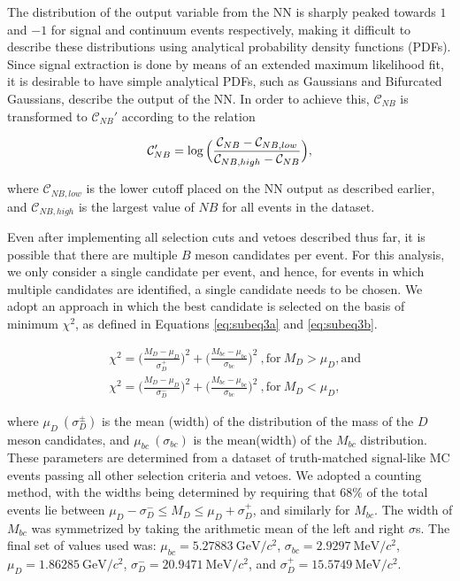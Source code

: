 \documentclass[aps,prl,twocolumn,superscriptaddress,showpacs,preprintnumbers,amsmath,amssymb]{revtex4}
\begin{document}
The distribution of the output variable from the NN is sharply peaked towards $1$ and $-1$ for signal and continuum events respectively, making it difficult to describe these distributions using analytical probability density functions (PDFs). Since signal extraction is done by means of an extended maximum likelihood fit, it is desirable to have simple analytical PDFs, such as Gaussians and Bifurcated Gaussians, describe the output of the NN. In order to achieve this, $\mathcal{C}_{NB}$ is transformed to $\mathcal{C}_{NB}'$ according to the relation

\begin{equation}
\label{eq:2
}
\mathcal{C}_{NB}' = \log \Big{(}\frac{\mathcal{C}_{NB} - \mathcal{C}_{NB,low}}{\mathcal{C}_{NB,high} - \mathcal{C}_{NB}}\Big{)},
\end{equation}

\noindent where $\mathcal{C}_{NB,low}$ is the lower cutoff placed on the NN output as described earlier, and $\mathcal{C}_{NB,high}$ is the largest value of $NB$ for all events in the dataset.

Even after implementing all selection cuts and vetoes described thus far, it is possible that there are multiple $B$ meson candidates per event. For this analysis, we only consider a single candidate per event, and hence, for events in which multiple candidates are identified, a single candidate needs to be chosen. We adopt an approach in which the best candidate is selected on the basis of minimum $\chi^2$, as defined in Equations \ref{eq:subeq3a} and \ref{eq:subeq3b}.

\begin{subequations} \label{eq:3}
\begin{align}
&\chi^2 = \big( \frac{M_D - \mu_D}{\sigma^+_D} \big)^2 +  \big( \frac{M_{bc} - \mu_{bc}}{\sigma_{bc}} \big)^2  ~, \text{for} ~ M_D > \mu_D, \text{and} \label{eq:subeq3a}\\
&\chi^2 = \big( \frac{M_D - \mu_D}{\sigma^-_D} \big)^2 + \big( \frac{M_{bc} - \mu_{bc}}{\sigma_{bc}} \big)^2  ~, \text{for} ~ M_D < \mu_D, \label{eq:subeq3b}
\end{align}
\end{subequations}

\noindent where $\mu_D ~ (\sigma^{\pm}_D)$ is the mean (width) of the distribution of the mass of the $D$ meson candidates, and $\mu_{bc} ~ (\sigma_{bc})$ is the mean(width) of the $M_{bc}$ distribution. These parameters are determined from a dataset of truth-matched signal-like MC events passing all other selection criteria and vetoes. We adopted a counting method, with the widths being determined by requiring that 68\% of the total events lie between $\mu_D - \sigma^-_D \leq M_D \leq \mu_D + \sigma^+_D$, and similarly for $M_{bc}$. The width of $M_{bc}$ was symmetrized by taking the arithmetic mean of the left and right $\sigma$s. The final set of values used was: $\mu_{bc} = 5.27883 ~\mathrm{GeV/}c^2$, $\sigma_{bc} = 2.9297 ~\mathrm{MeV/}c^2$, $\mu_{D} = 1.86285 ~\mathrm{GeV/}c^2$, $\sigma_{D}^- = 20.9471 ~\mathrm{MeV/}c^2$, and $\sigma_{D}^+ = 15.5749 ~\mathrm{MeV/}c^2$.
\end{document}
